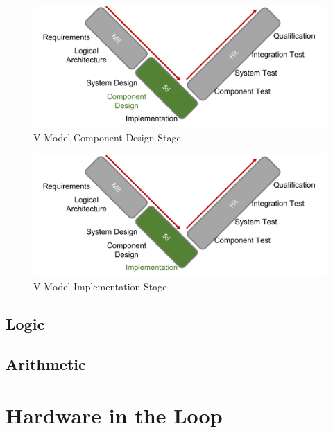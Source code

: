 \begin{figure}[h!]
    \begin{center}
    \includegraphics[width=12cm]{Pictures/V Model Component Design.png}
    \caption[V Model Component Design]{V Model Component Design Stage}
    \label{V Model Component Design}
    \end{center}
\end{figure}

\begin{figure}[h!]
    \begin{center}
    \includegraphics[width=12cm]{Pictures/V Model Implementation.png}
    \caption[V Model Implementation]{V Model Implementation Stage}
    \label{V Model Implementation}
    \end{center}
\end{figure}

\subsection{Logic}
\subsection{Arithmetic}

\section{Hardware in the Loop}
